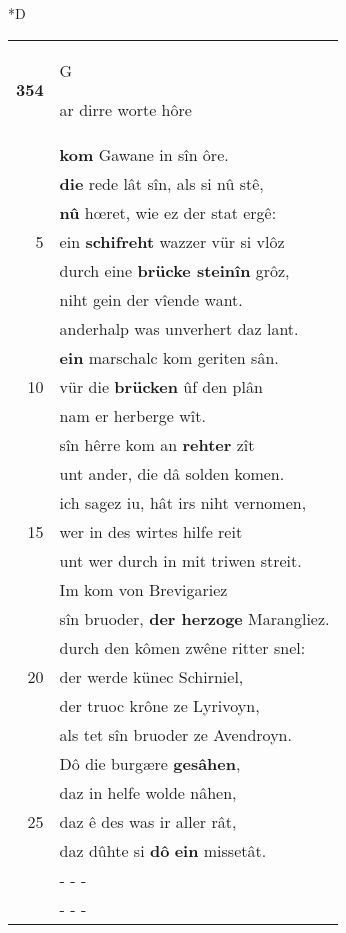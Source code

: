 \documentclass[8pt,a4paper,notitlepage]{article}
\begin{document}
\begin{table}[ht]
\begin{minipage}[t]{0.5\linewidth}
\small
\begin{center}*D
\end{center}
\begin{tabular}{rl}
\textbf{354} & \begin{large}G\end{large}ar dirre worte hôre\\ 
 & \textbf{kom} Gawane in sîn ôre.\\ 
 & \textbf{die} rede lât sîn, als si nû stê,\\ 
 & \textbf{nû} hœret, wie ez der stat ergê:\\ 
5 & ein \textbf{schifreht} wazzer vür si vlôz\\ 
 & durch eine \textbf{brücke steinîn} grôz,\\ 
 & niht gein der vîende want.\\ 
 & anderhalp was unverhert daz lant.\\ 
 & \textbf{ein} marschalc kom geriten sân.\\ 
10 & vür die \textbf{brücken} ûf den plân\\ 
 & nam er herberge wît.\\ 
 & sîn hêrre kom an \textbf{rehter} zît\\ 
 & unt ander, die dâ solden komen.\\ 
 & ich sagez iu, hât irs niht vernomen,\\ 
15 & wer in des wirtes hilfe reit\\ 
 & unt wer durch in mit triwen streit.\\ 
 & Im kom von Brevigariez\\ 
 & sîn bruoder, \textbf{der herzoge} Marangliez.\\ 
 & durch den kômen zwêne ritter snel:\\ 
20 & der werde künec Schirniel,\\ 
 & der truoc krône ze Lyrivoyn,\\ 
 & als tet sîn bruoder ze Avendroyn.\\ 
 & Dô die burgære \textbf{gesâhen},\\ 
 & daz in helfe wolde nâhen,\\ 
25 & daz ê des was ir aller rât,\\ 
 & daz dûhte si \textbf{dô} \textbf{ein} missetât.\\ 
 & \multicolumn{1}{l}{ - - - }\\ 
 & \multicolumn{1}{l}{ - - - }\\ 

\end{tabular}
\end{minipage}
\end{table}
\end{document}
